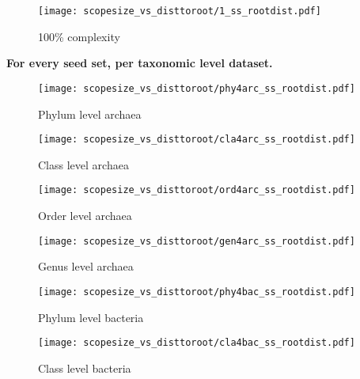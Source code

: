\begin{figure}[H]
    \centering
    \texttt{[image: scopesize\_vs\_disttoroot/1\_ss\_rootdist.pdf]}
    \caption{100\% complexity}
    \label{1_scopesize}
\end{figure}   

\textbf{For every seed set, per taxonomic level dataset.}

\begin{figure}[H]
    \centering
    \texttt{[image: scopesize\_vs\_disttoroot/phy4arc\_ss\_rootdist.pdf]}
    \caption{Phylum level archaea}
    \label{phyarc_scopesize}
\end{figure}   

\begin{figure}[H]
    \centering
    \texttt{[image: scopesize\_vs\_disttoroot/cla4arc\_ss\_rootdist.pdf]}
    \caption{Class level archaea}
    \label{claarc_scopesize}
\end{figure}   

\begin{figure}[H]
    \centering
    \texttt{[image: scopesize\_vs\_disttoroot/ord4arc\_ss\_rootdist.pdf]}
    \caption{Order level archaea}
    \label{ordarc_scopesize}
\end{figure}   

\begin{figure}[H]
    \centering
    \texttt{[image: scopesize\_vs\_disttoroot/gen4arc\_ss\_rootdist.pdf]}
    \caption{Genus level archaea}
    \label{genarc_scopesize}
\end{figure}   

\begin{figure}[H]
    \centering
    \texttt{[image: scopesize\_vs\_disttoroot/phy4bac\_ss\_rootdist.pdf]}
    \caption{Phylum level bacteria}
    \label{phybac_scopesize}
\end{figure}   

\begin{figure}[H]
    \centering
    \texttt{[image: scopesize\_vs\_disttoroot/cla4bac\_ss\_rootdist.pdf]}
    \caption{Class level bacteria}
    \label{clabac_scopesize}
\end{figure}   






